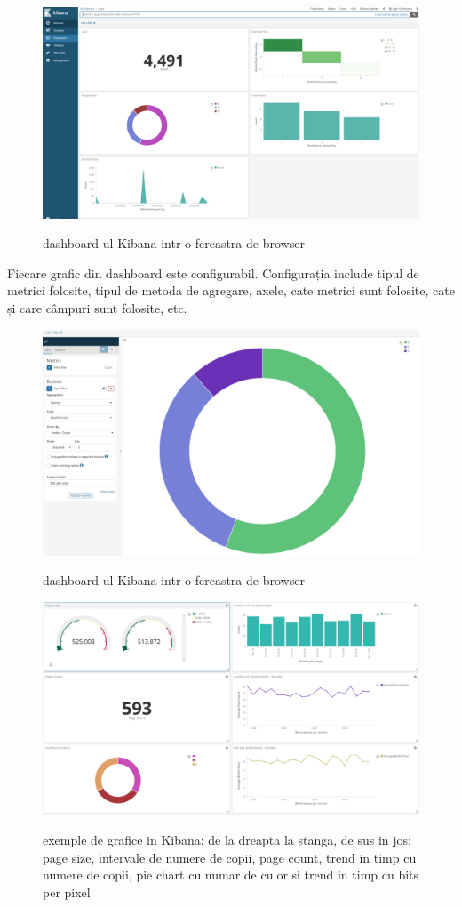 \documentclass[a4paper, 12pt, twoside]{report}
\begin{document}
	\begin{figure}
		\centering
		{\includegraphics[width=160mm]{kibana-dashboard.png}}
		\caption{dashboard-ul Kibana intr-o fereastra de browser}
	\end{figure}
	Fiecare grafic din dashboard este configurabil. Configurația include tipul de metrici folosite, tipul de metoda de agregare, axele, cate metrici sunt folosite, cate și care câmpuri sunt folosite, etc.
	\begin{figure}
		\centering
		{\includegraphics[width=160mm]{kibana-chart-config.png}}
		\caption{dashboard-ul Kibana intr-o fereastra de browser}
	\end{figure}
	\begin{figure}
		\centering
		{\includegraphics[width=160mm]{dashboard.png}}
		\caption{exemple de grafice in Kibana; de la dreapta la stanga, de sus in jos: page size, intervale de numere de copii, page count, trend in timp cu numere de copii, pie chart cu numar de culor si trend in timp cu bits per pixel}
	\end{figure}
\end{document}
